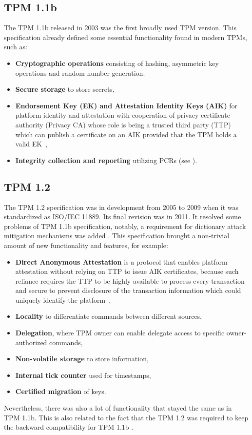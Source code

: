 \subsection{TPM 1.1b}
The TPM 1.1b released in 2003 was the first broadly used TPM version. This specification already defined some essential functionality found in modern TPMs, such as:
\begin{itemize}
    \item \textbf{Cryptographic operations} consisting of hashing, asymmetric key operations and random number generation.
    \item \textbf{Secure storage} to store secrets,
    \item \textbf{Endorsement Key (EK) and Attestation Identity Keys (AIK)} for platform identity and attestation with cooperation of privacy certificate authority (Privacy CA) whose role is being a trusted third party (TTP) which can publish a certificate on an AIK provided that the TPM holds a valid EK~\cite{chenPrivacyCA},
    \item \textbf{Integrity collection and reporting} utilizing PCRs (see ).
\end{itemize}

\subsection{TPM 1.2}
The TPM 1.2 specification was in development from 2005 to 2009 when it was standardized as ISO/IEC 11889. Its final revision was in 2011. It resolved some problems of TPM 1.1b specification, notably, a requirement for dictionary attack mitigation mechanisms was added \cite[p.~36-37]{tcg_1.2_design_princ}. This specification brought a non-trivial amount of new functionality and features, for example:
\begin{itemize}
    \item \textbf{Direct Anonymous Attestation} is a protocol that enables platform attestation without relying on TTP to issue AIK certificates, because such reliance requires the TTP to be highly available to process every transaction and secure to prevent disclosure of the transaction information which could uniquely identify the platform~\cite{daaSpec, daaDesignAndImple},
    \item \textbf{Locality} to differentiate commands between different sources,
    \item \textbf{Delegation}, where TPM owner can enable delegate access to specific owner-authorized commands,
    \item \textbf{Non-volatile storage} to store information,
    \item \textbf{Internal tick counter} used for timestamps,
    \item \textbf{Certified migration} of keys.
\end{itemize}
Nevertheless, there was also a lot of functionality that stayed the same as in TPM 1.1b. This is also related to the fact that the TPM 1.2 was required to keep the backward compatibility for TPM 1.1b \cite[p.~169]{tcg_1.2_design_princ}.

